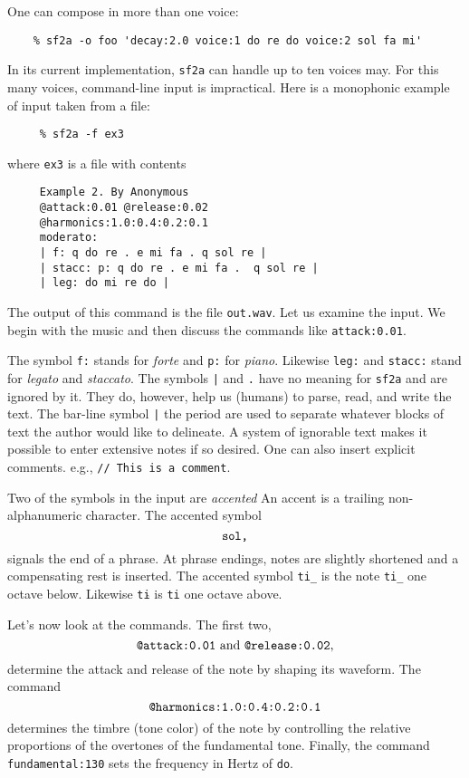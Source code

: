 \documentclass[11pt]{amsart}
\newcommand{\mcaret}{$\hat{}$}
\begin{document}
One can compose in more than one voice:
\begin{verbatim}
    % sf2a -o foo 'decay:2.0 voice:1 do re do voice:2 sol fa mi'
\end{verbatim}
In its current implementation, {\tt sf2a} can handle up to ten voices may.
For this many voices, command-line input is impractical.  Here is a monophonic
example of input taken from a file:
\begin{verbatim}
     % sf2a -f ex3
\end{verbatim}
where {\tt ex3} is a file with contents
\begin{verbatim}
     Example 2. By Anonymous
     @attack:0.01 @release:0.02 
     @harmonics:1.0:0.4:0.2:0.1
     moderato:
     | f: q do re . e mi fa . q sol re |
     | stacc: p: q do re . e mi fa .  q sol re |
     | leg: do mi re do | 
\end{verbatim}
The output of this command is the file {\tt out.wav}.
Let us examine the input.  We begin with the music and then discuss
the commands like {\tt attack:0.01}.  

The symbol
 {\tt f:} stands for \emph{forte} and {\tt p:} for \emph{piano}.
Likewise {\tt leg:} and {\tt stacc:} stand for \emph{legato} and \emph{staccato}.
The symbols {\tt |} and {\tt .} have no meaning for {\tt sf2a} and are ignored
by it.  They do, however, help us (humans) to parse, read, and write the text.  
The bar-line symbol {\tt |} the period are used
to separate whatever blocks of text the author would like to delineate.  A system
of ignorable text makes it possible to enter extensive notes if so desired.  
One can also insert explicit comments. e.g., {\tt // This is a comment}.    


Two of the symbols in the input are \emph{accented}  An accent is a trailing
non-alphanumeric character.  The accented symbol 
\[
  \hbox{{\tt sol,}}
\] 
signals the
end of a phrase.  At phrase endings, notes are slightly shortened and
a compensating rest is inserted.  The accented symbol {\tt ti\_} is the
note {\tt ti\_} one octave below.  Likewise {\tt ti\mcaret} is  {\tt ti} one
octave above.

Let's now look at the commands.  The first two, 
\[
  \hbox{{\tt @attack:0.01} and {\tt @release:0.02},}
\]
determine the attack and release of the note by shaping its waveform.
The command 
\[
  \hbox{{\tt @harmonics:1.0:0.4:0.2:0.1}}
\]
determines the timbre (tone color) of the 
note by controlling the relative proportions of the overtones of the fundamental
tone. Finally, the command {\tt fundamental:130} sets the frequency in Hertz of {\tt do}.
\end{document}
